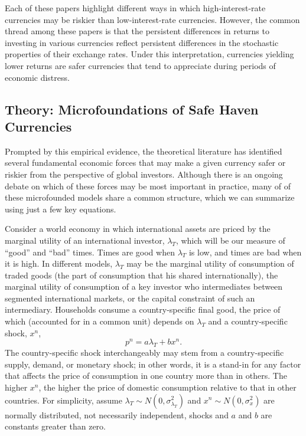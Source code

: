 \documentclass{ar-1col}
\begin{document}
Each of these papers highlight different ways in which
high-interest-rate currencies may be riskier than low-interest-rate
currencies. However, the common thread among these papers is that the
persistent differences in returns to investing in various currencies
reflect persistent differences in the stochastic properties of their
exchange rates. Under this interpretation, currencies yielding lower
returns are safer currencies that tend to appreciate during periods of
economic distress.


\subsection{Theory: Microfoundations of Safe Haven Currencies}

Prompted by this empirical evidence, the theoretical literature has
identified several fundamental economic forces that may make a given
currency safer or riskier from the perspective of global investors.
Although there is an ongoing debate on which of these forces may be
most important in practice, many of of these microfounded models share
a common structure, which we can summarize using just a few key
equations.

Consider a world economy in which international assets are priced by
the marginal utility of an international investor, $\lambda_T$, which
will be our measure of ``good'' and ``bad'' times. Times are good when
$\lambda_T$ is low, and times are bad when it is high. In different
models, $\lambda_T$ may be the marginal utility of consumption of
traded goods (the part of consumption that his shared
internationally), the marginal utility of consumption of a key
investor who intermediates between segmented international markets, or
the capital constraint of such an intermediary. Households consume a
country-specific final good, the price of which (accounted for in a
common unit) depends on $\lambda_T$ and a country-specific shock,
$x^n$,
\begin{equation}
  p^{n}=a\lambda _{T}+b x^{n}.  \label{eq_RF}
\end{equation}%
The country-specific shock interchangeably may stem from a
country-specific supply, demand, or monetary shock; in other words, it
is a stand-in for any factor that affects the price of consumption in
one country more than in others. The higher $x^{n}$, the higher the
price of domestic consumption relative to that in other countries. For
simplicity, assume $\lambda _{T}\sim N(0,\sigma^2_{\lambda_{T}})$ and
$x^{n} \sim N(0,\sigma^2_x) $ are normally distributed, not
necessarily independent, shocks and $a$ and $b$ are constants greater
than zero.
\end{document}
